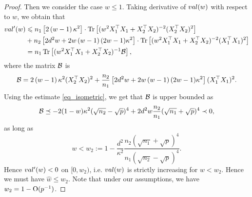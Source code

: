 \begin{proof}
Then we consider the case $w\le 1$. Taking derivative of $\val(w)$ with respect to $w$, we obtain that
\begin{align}
	\val'(w) &\le n_1 \left[2\left( w-1\right) \kappa^2\right]\cdot \tr\left[( w^2X_1^{\top}X_1 +X_2^{\top}X_2)^{-2} (X_2^{\top}X_2)^2\right] \nonumber \\
	& + n_2\left[2d^2w +2w\left( w-1\right)(2w-1)\kappa^2\right]\cdot \tr\left[( w^2X_1^{\top}X_1 +X_2^{\top}X_2)^{-2} (X_1^{\top}X_1)^2\right] \nonumber\\
			& = n_1 \bigtr{(w^2X_1^{\top}X_1  + X_2^{\top}X_2)^{-1} \cal B} , \nonumber
\end{align}
where the matrix $\cal B$ is
$$\cal B= 2\left( w-1\right) \kappa^2  (X_2^{\top}X_2)^2+\frac{n_2}{n_1}\left[2d^2w +2w\left( w-1\right)(2w-1)\kappa^2\right](X_1^{\top}X_1)^2.$$
Using the estimate \eqref{eq_isometric}, we get that $\cal B$ is upper bounded as
\begin{align*}
\cal B \preceq - 2(1-w)\kappa^2(\sqrt{n_2}-\sqrt{p})^4 +2d^2 w\frac{n_2}{n_1}(\sqrt{n_1}+\sqrt{p})^4 \prec 0,
\end{align*}
as long as
$$w< w_2:=1 -   \frac{d^2}{\kappa^2}\frac{n_2(\sqrt{n_1}+\sqrt{p})^4}{n_1(\sqrt{n_2}-\sqrt{p})^4}.$$
Hence $\val'(w)<0$ on $[0,w_2)$, i.e. $\val(w)$ is strictly increasing for $w<w_2$. Hence we must have $\hat w\le w_2$. Note that under our assumptions, we have $w_2=1-\OO(p^{-1})$.
\end{proof}




